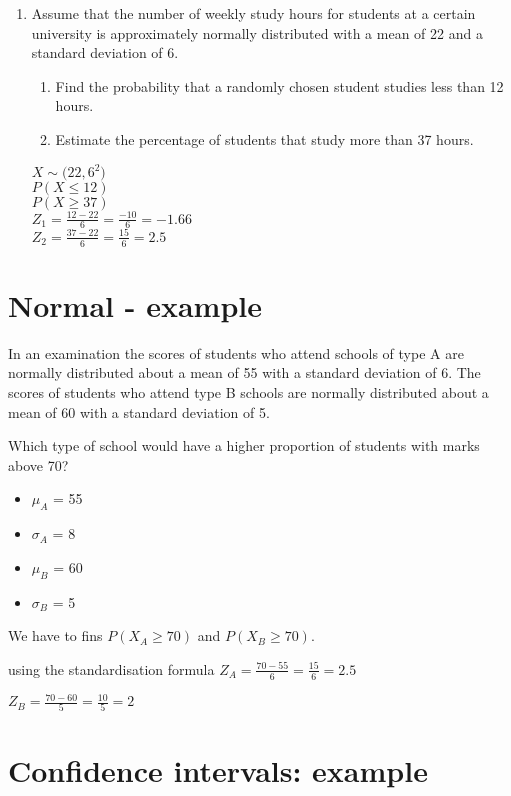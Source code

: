 \documentclass[12pt]{article}
\begin{document}
\begin{enumerate}

\item Assume that the number of weekly study hours for students at a certain university
is approximately normally distributed with a mean of 22 and a standard deviation
of 6.
\begin{enumerate}
\item Find the probability that a randomly chosen student studies less than 12
hours.
\item Estimate the percentage of students that study more than 37 hours.
\end{enumerate}


$X \sim \mathcal(22,6^2)$\\
$P(X \leq 12)$\\
$P(X \geq 37)$\\
$Z_1 = \frac{12 - 22}{6} = \frac{-10}{6} = -1.66 $\\
$Z_2 = \frac{37 - 22}{6} = \frac{15}{6} = 2.5 $


\end{enumerate}


\section{Normal - example}

In an examination the scores of students who attend schools of type A are
normally distributed about a mean of 55 with a standard deviation of 6. The
scores of students who attend type B schools are normally distributed about a
mean of 60 with a standard deviation of 5.

Which type of school would have a higher proportion of students with marks above 70?

\begin{itemize}
\item $\mu_A$ = 55
\item $\sigma_A$ = 8
\item $\mu_B$ = 60
\item $\sigma_B$ = 5
\end{itemize}

We have to fins $P(X_A \geq 70)$
and $P(X_B \geq 70)$.


using the standardisation formula
$Z_A = \frac{70 - 55}{6} = \frac{15}{6} = 2.5 $

$Z_B = \frac{70 - 60}{5} = \frac{10}{5} = 2 $

\newpage

\section*{Confidence intervals: example}
\end{document}
